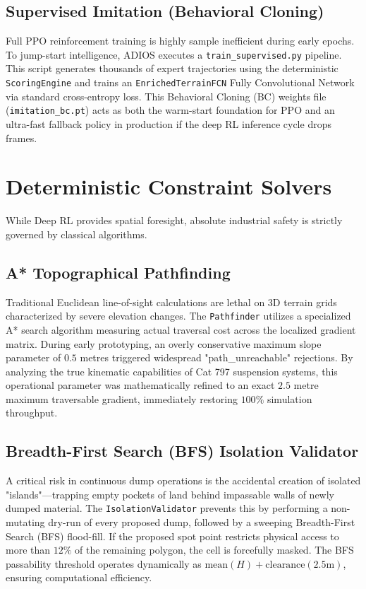 \documentclass[conference]{IEEEtran}
\begin{document}
\subsection{Supervised Imitation (Behavioral Cloning)}
Full PPO reinforcement training is highly sample inefficient during early epochs. To jump-start intelligence, ADIOS executes a \texttt{train\_supervised.py} pipeline. This script generates thousands of expert trajectories using the deterministic \texttt{ScoringEngine} and trains an \texttt{EnrichedTerrainFCN} Fully Convolutional Network via standard cross-entropy loss. This Behavioral Cloning (BC) weights file (\texttt{imitation\_bc.pt}) acts as both the warm-start foundation for PPO and an ultra-fast fallback policy in production if the deep RL inference cycle drops frames.

\section{Deterministic Constraint Solvers}

While Deep RL provides spatial foresight, absolute industrial safety is strictly governed by classical algorithms.

\subsection{A* Topographical Pathfinding}
Traditional Euclidean line-of-sight calculations are lethal on 3D terrain grids characterized by severe elevation changes. The \texttt{Pathfinder} utilizes a specialized A* search algorithm measuring actual traversal cost across the localized gradient matrix. During early prototyping, an overly conservative maximum slope parameter of $0.5$ metres triggered widespread "path\_unreachable" rejections. By analyzing the true kinematic capabilities of Cat 797 suspension systems, this operational parameter was mathematically refined to an exact $2.5$ metre maximum traversable gradient, immediately restoring $100\%$ simulation throughput.

\subsection{Breadth-First Search (BFS) Isolation Validator}
A critical risk in continuous dump operations is the accidental creation of isolated "islands"—trapping empty pockets of land behind impassable walls of newly dumped material. The \texttt{IsolationValidator} prevents this by performing a non-mutating dry-run of every proposed dump, followed by a sweeping Breadth-First Search (BFS) flood-fill. If the proposed spot point restricts physical access to more than $12\%$ of the remaining polygon, the cell is forcefully masked. The BFS passability threshold operates dynamically as $\text{mean}(H) + \text{clearance}(2.5\text{m})$, ensuring computational efficiency.
\end{document}

